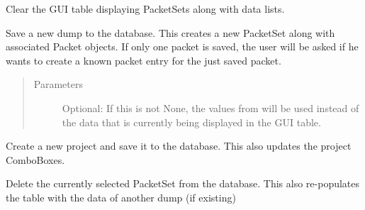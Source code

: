 \documentclass[letterpaper,10pt,english]{sphinxmanual}
\begin{document}
\begin{fulllineitems}
\begin{fulllineitems}
\label{\detokenize{src:src.ManagerTab.ManagerTab.clear}}
Clear the GUI table displaying PacketSets along with data lists.

\end{fulllineitems}


\begin{fulllineitems}
\label{\detokenize{src:src.ManagerTab.ManagerTab.createDump}}
Save a new dump to the database. This creates a new PacketSet along with associated Packet objects.
If only one packet is saved, the user will be asked if he wants to create a known packet entry for the
just saved packet.
\begin{quote}\begin{description}
\item[{Parameters}] \leavevmode
{} \textendash{} Optional: If this is not None, the values from  will be used instead of
the data that is currently being displayed in the GUI table.

\end{description}\end{quote}

\end{fulllineitems}


\begin{fulllineitems}
\label{\detokenize{src:src.ManagerTab.ManagerTab.createProject}}
Create a new project and save it to the database. This also updates the project ComboBoxes.

\end{fulllineitems}


\begin{fulllineitems}
\label{\detokenize{src:src.ManagerTab.ManagerTab.deleteDump}}
Delete the currently selected PacketSet from the database. This also re-populates the table with the data
of another dump (if existing)


\end{fulllineitems}
\end{fulllineitems}
\end{document}
